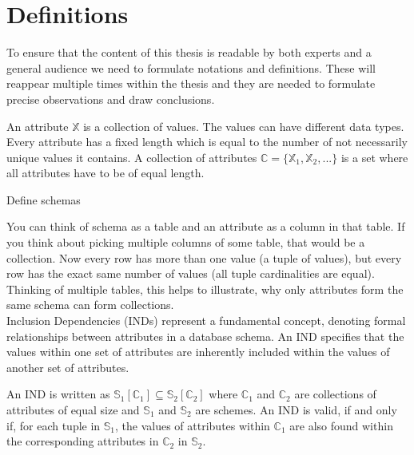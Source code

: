 \chapter{Definitions}

To ensure that the content of this thesis is readable by both experts and a general audience we need to formulate notations and definitions. These will reappear multiple times within the thesis and they are needed to formulate precise observations and draw conclusions.

\begin{definition}[Attributes]\label{def:attributes}
    An attribute $\mathbb{X}$ is a collection of values. The values can have different data types. Every attribute has a fixed length which is equal to the number of not necessarily unique values it contains. A collection of attributes $\mathbb{C} = \{\mathbb{X}_1, \mathbb{X}_2, ... \}$ is a set where all attributes have to be of equal length.
\end{definition}

\begin{definition}[Schemas]\label{def:schema}
    Define schemas
\end{definition}

You can think of schema as a table and an attribute as a column in that table. If you think about picking multiple columns of some table, that would be a collection. Now every row has more than one value (a tuple of values), but every row has the exact same number of values (all tuple cardinalities are equal). Thinking of multiple tables, this helps to illustrate, why only attributes form the same schema can form collections. \\

Inclusion Dependencies (INDs) represent a fundamental concept, denoting formal relationships between attributes in a database schema. An IND specifies that the values within one set of attributes are inherently included within the values of another set of attributes.

\begin{definition}\label{def:inds}
    An IND is written as $\mathbb{S}_1[\mathbb{C}_1] \subseteq \mathbb{S}_2[\mathbb{C}_2]$ where $\mathbb{C}_1$ and $\mathbb{C}_2$ are collections of attributes of equal size and $\mathbb{S}_1$ and $\mathbb{S}_2$ are schemes. An IND is valid, if and only if, for each tuple in $\mathbb{S}_1$, the values of attributes within $\mathbb{C}_1$ are also found within the corresponding attributes in $\mathbb{C}_2$ in $\mathbb{S}_2$.
\end{definition}

